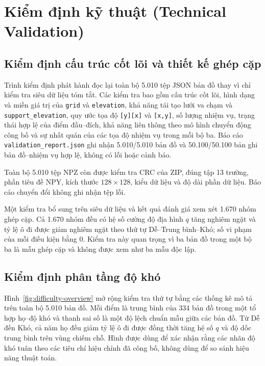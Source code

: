 \documentclass[11pt]{article}
\begin{document}
\section{Kiểm định kỹ thuật (Technical Validation)}

\subsection{Kiểm định cấu trúc cốt lõi và thiết kế ghép cặp}

Trình kiểm định phát hành đọc lại toàn bộ 5.010 tệp JSON bản đồ thay vì chỉ kiểm
tra siêu dữ liệu tóm tắt. Các kiểm tra bao gồm cấu trúc cốt lõi, hình dạng và miền
giá trị của \texttt{grid} và \texttt{elevation}, khả năng tái tạo lưới va chạm
và \texttt{support\_elevation}, quy ước tọa độ \texttt{[y][x]} và
\texttt{[x,y]}, số lượng nhiệm vụ, trạng thái hợp lệ của điểm đầu--đích, khả năng
liên thông theo mô hình chuyển động công bố và sự nhất quán của các tọa độ nhiệm
vụ trong mỗi bộ ba. Báo cáo
\texttt{validation\_report.json} ghi nhận 5.010/5.010 bản đồ và 50.100/50.100 bản
ghi bản đồ--nhiệm vụ hợp lệ, không có lỗi hoặc cảnh báo.

Toàn bộ 5.010 tệp NPZ còn được kiểm tra CRC của ZIP, đúng tập 13 trường, phần
tiêu đề NPY, kích thước $128\times128$, kiểu dữ liệu và độ dài phần dữ liệu. Báo cáo chuyển
đổi không ghi nhận tệp lỗi.

Một kiểm tra bổ sung trên siêu dữ liệu và kết quả đánh giá xem xét 1.670
nhóm ghép cặp. Cả 1.670 nhóm đều có hệ số cường độ địa hình $q$ tăng nghiêm ngặt và tỷ lệ ô
đi được giảm nghiêm ngặt theo thứ tự Dễ--Trung bình--Khó; số vi phạm của
mỗi điều kiện bằng 0. Kiểm tra này quan trọng vì ba bản đồ trong một bộ ba là
mẫu ghép cặp và không được xem như ba mẫu độc lập.

\subsection{Kiểm định phân tầng độ khó}

Hình~\ref{fig:difficulty-overview} mở rộng kiểm tra thứ tự bằng các thống kê mô
tả trên toàn bộ 5.010 bản đồ. Mỗi điểm là trung bình của 334 bản đồ trong một tổ hợp
họ--độ khó và thanh sai số là một độ lệch chuẩn mẫu giữa các bản đồ. Từ Dễ đến
Khó, cả năm họ đều giảm tỷ lệ ô đi được đồng thời tăng hệ số $q$ và
độ dốc trung bình trên vùng chiếm chỗ. Hình được dùng để xác nhận rằng các nhãn độ
khó tuân theo các tiêu chí hiệu chỉnh đã công bố, không dùng để so sánh hiệu năng
thuật toán.
\end{document}
